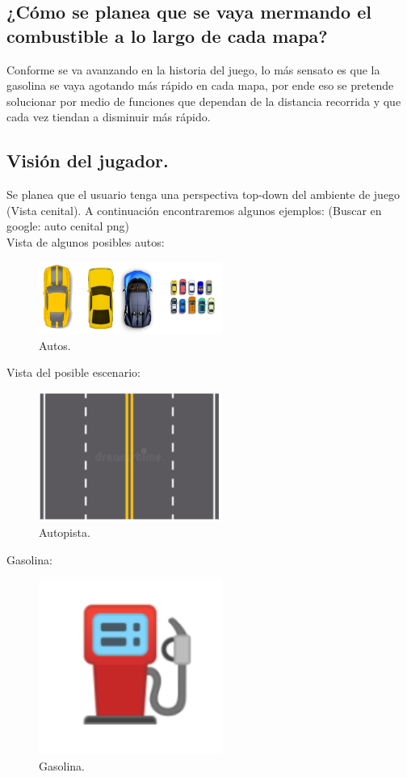 \documentclass{article}
\begin{document}
\subsection{¿Cómo se planea que se vaya mermando el combustible a lo largo de cada mapa?}
Conforme se va avanzando en la historia del juego, lo más sensato es que la gasolina se vaya agotando más rápido en cada mapa, por ende eso se pretende solucionar por medio de funciones que dependan de la distancia recorrida y que cada vez tiendan a disminuir más rápido.
\subsection{Visión del jugador.}
Se planea que el usuario tenga una  perspectiva top-down del ambiente de juego (Vista cenital). A continuación encontraremos algunos ejemplos:
(Buscar en google: auto cenital png)
\\
Vista de algunos posibles autos:
\begin{figure}[h]
\includegraphics[width=6cm]{autos.PNG}
\centering
\caption{Autos.}
\label{fig:autos}
\end{figure}
Vista del posible escenario:
\begin{figure}[h]
\includegraphics[width=6cm]{autopista.PNG}
\centering
\caption{Autopista.}
\label{fig:autopista}
\end{figure}
Gasolina:
\begin{figure}[h]
\includegraphics[width=6cm]{gasolina.PNG}
\centering
\caption{Gasolina.}
\label{fig:gasolina}
\end{figure}
\end{document}
